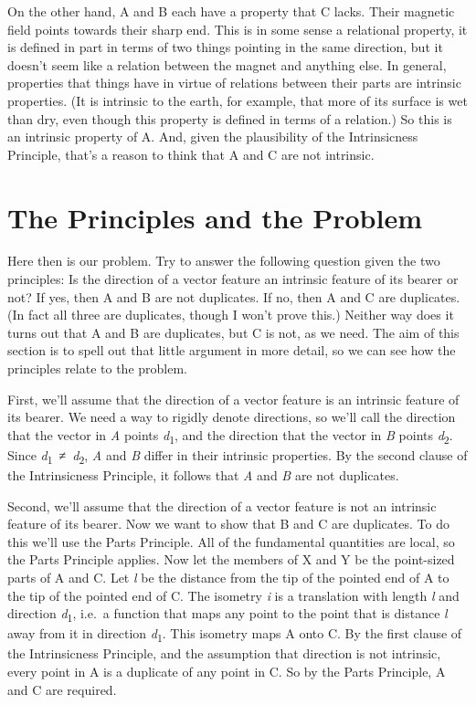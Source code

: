 \documentclass[
  10pt,
  letterpaper,
  DIV=11,
  numbers=noendperiod,
  twoside]{scrartcl}
\begin{document}
On the other hand, A and B each have a property that C lacks. Their
magnetic field points towards their sharp end. This is in some sense a
relational property, it is defined in part in terms of two things
pointing in the same direction, but it doesn't seem like a relation
between the magnet and anything else. In general, properties that things
have in virtue of relations between their parts are intrinsic
properties. (It is intrinsic to the earth, for example, that more of its
surface is wet than dry, even though this property is defined in terms
of a relation.) So this is an intrinsic property of A. And, given the
plausibility of the Intrinsicness Principle, that's a reason to think
that A and C are not intrinsic.

\section{The Principles and the
Problem}\label{the-principles-and-the-problem}

Here then is our problem. Try to answer the following question given the
two principles: Is the direction of a vector feature an intrinsic
feature of its bearer or not? If yes, then A and B are not duplicates.
If no, then A and C are duplicates. (In fact all three are duplicates,
though I won't prove this.) Neither way does it turns out that A and B
are duplicates, but C is not, as we need. The aim of this section is to
spell out that little argument in more detail, so we can see how the
principles relate to the problem.

First, we'll assume that the direction of a vector feature is an
intrinsic feature of its bearer. We need a way to rigidly denote
directions, so we'll call the direction that the vector in \emph{A}
points \emph{d}\textsubscript{1}, and the direction that the vector in
\emph{B} points \emph{d}\textsubscript{2}. Since
\emph{d}\textsubscript{1}~≠~\emph{d}\textsubscript{2}, \emph{A} and
\emph{B} differ in their intrinsic properties. By the second clause of
the Intrinsicness Principle, it follows that \emph{A} and \emph{B} are
not duplicates.

Second, we'll assume that the direction of a vector feature is not an
intrinsic feature of its bearer. Now we want to show that B and C are
duplicates. To do this we'll use the Parts Principle. All of the
fundamental quantities are local, so the Parts Principle applies. Now
let the members of X and Y be the point-sized parts of A and C. Let
\emph{l} be the distance from the tip of the pointed end of A to the tip
of the pointed end of C. The isometry \emph{i} is a translation with
length \emph{l} and direction \emph{d}\textsubscript{1}, i.e.~a function
that maps any point to the point that is distance \emph{l} away from it
in direction \emph{d}\textsubscript{1}. This isometry maps A onto C. By
the first clause of the Intrinsicness Principle, and the assumption that
direction is not intrinsic, every point in A is a duplicate of any point
in C. So by the Parts Principle, A and C are required.
\end{document}
